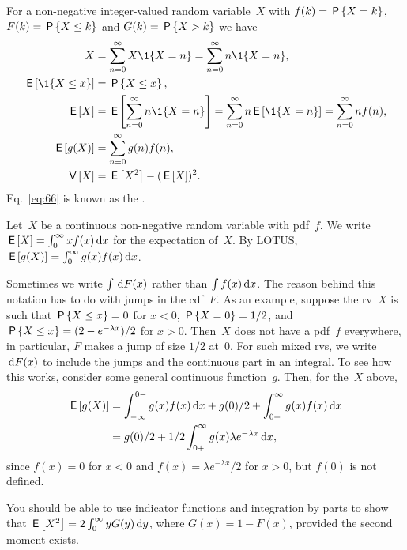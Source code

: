 \documentclass[queueing-book.tex]{subfiles}
\begin{document}
For a non-negative integer-valued random variable~$X$ with  $f(k)= \P{X = k}$,
 $F(k)=\P{X\leq k}$ and  $G(k) = \P{X>k}$ we have
\begin{subequations}\label{eq:105}
\begin{align}
X&=\sum_{n=0}^\infty X\1{X=n} = \sum_{n=0}^\infty n \1{X=n}, \label{eq:77} \\
\E{\1{X\leq x}} &= \P{X\leq x}, \label{eq:74}\\
\E X &= \E{\sum_{n=0}^\infty n \1{X=n}} = \sum_{n=0}^\infty n \E{\1{X=n}} = \sum_{n=0}^\infty n f(n), \label{eq:p-78} \\
  \E{g(X)} &= \sum_{n=0}^\infty g(n) f(n), \label{eq:66} \\
  \V X &= \E{X^2} - (\E X)^2.\label{eq:68}\\
\end{align}
\end{subequations}
Eq.~\cref{eq:66} is known as the .


Let~$X$ be a continuous non-negative random variable with pdf~$f$.
We write $ \E{X} = \int_0^\infty x f(x) \d x$ for the expectation of~$X$. By LOTUS, $\E{g(X)} = \int_0^\infty g(x) f(x) \d x$.

Sometimes we write $\int \d F(x)$ rather than $\int f(x) \d x$.
The reason behind this notation has to do with jumps in the cdf~$F$.
As an example, suppose the rv~$X$ is such that $\P{X\leq x} = 0$ for $x<0$, $\P{X=0} = 1/2$, and $\P{X\leq x} = (2-e^{-\lambda x})/2$ for $x>0$.
Then~$X$ does not have a pdf~$f$ everywhere, in particular, $F$ makes a jump of size $1/2$ at~$0$.
For such mixed rvs, we write $\d F(x)$ to include the jumps and the continuous part in an integral.
To see how this works, consider some general continuous function~$g$.
Then, for the~$X$ above,
\begin{align*}
\E{g(X)} &= \int_{-\infty}^{0-} g(x) f(x) \d x + g(0)/2 + \int_{0+}^{\infty} g(x) f(x) \d x \\
 &= g(0)/2 + 1/2 \int_{0+}^{\infty} g(x) \lambda e^{-\lambda x} \d x,
\end{align*}
since $f(x) = 0$ for $x<0$ and $f(x) = \lambda e^{-\lambda x}/2$ for $x>0$, but  $f(0)$ is not defined.


You should be able to use indicator functions and integration by parts to show that $\E{X^2} = 2\int_0^\infty y G(y) \d y$, where $G(x) = 1- F(x)$, provided the second moment exists.
\end{document}
